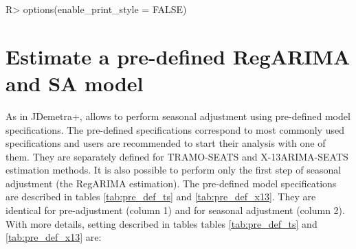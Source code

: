 \documentclass[article]{jss}
\begin{document}
\begin{CodeChunk}

\begin{CodeInput}
R> options(enable_print_style = FALSE)
\end{CodeInput}
\end{CodeChunk}

\hypertarget{pre-def-est}{%
\section{Estimate a pre-defined RegARIMA and SA
model}\label{pre-def-est}}

As in JDemetra+,  allows to perform seasonal adjustment
using pre-defined model specifications. The pre-defined specifications
correspond to most commonly used specifications and users are
recommended to start their analysis with one of them. They are
separately defined for TRAMO-SEATS and X-13ARIMA-SEATS estimation
methods. It is also possible to perform only the first step of seasonal
adjustment (the RegARIMA estimation). The pre-defined model
specifications are described in tables \ref{tab:pre_def_ts} and
\ref{tab:pre_def_x13}. They are identical for pre-adjustment (column 1)
and for seasonal adjustment (column 2). With more details, setting
described in tables tables \ref{tab:pre_def_ts} and
\ref{tab:pre_def_x13} are:
\end{document}
